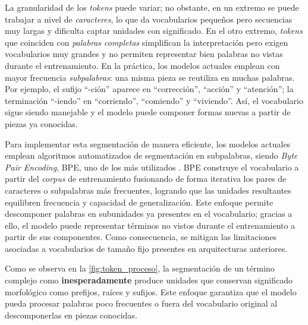 \documentclass[12pt,a4paper]{report}
\begin{document}
La granularidad de los \textit{tokens} puede variar; no obstante, en un extremo se puede trabajar a nivel de \emph{caracteres}, lo que da vocabularios pequeños pero secuencias muy largas y dificulta captar unidades con significado. En el otro extremo, \textit{tokens} que coinciden con \emph{palabras completas} simplifican la interpretación pero exigen vocabularios muy grandes y no permiten representar bien palabras no vistas durante el entrenamiento. En la práctica, los modelos actuales emplean con mayor frecuencia \emph{subpalabras}: una misma pieza se reutiliza en muchas palabras. Por ejemplo, el sufijo ``-ción'' aparece en ``corrección'', ``acción'' y ``atención''; la terminación ``-iendo'' en ``corriendo'', ``comiendo'' y ``viviendo''. Así, el vocabulario sigue siendo manejable y el modelo puede componer formas nuevas a partir de piezas ya conocidas.

Para implementar esta segmentación de manera eficiente, los modelos actuales emplean algoritmos automatizados de segmentación en subpalabras, siendo \textit{Byte Pair Encoding}, BPE, uno de los más utilizados \cite{sennrich-etal-2016-neural}. BPE construye el vocabulario a partir del \textit{corpus} de entrenamiento fusionando de forma iterativa los pares de caracteres o subpalabras más frecuentes, logrando que las unidades resultantes equilibren frecuencia y capacidad de generalización. Este enfoque permite descomponer palabras en subunidades ya presentes en el vocabulario; gracias a ello, el modelo puede representar términos no vistos durante el entrenamiento a partir de sus componentes. Como consecuencia, se mitigan las limitaciones asociadas a vocabularios de tamaño fijo presentes en arquitecturas anteriores.

Como se observa en la \autoref{fig:token_proceso}, la segmentación de un término complejo como \textbf{inesperadamente} produce unidades que conservan significado morfológico como prefijos, raíces y sufijos. Este enfoque garantiza que el modelo pueda procesar palabras poco frecuentes o fuera del vocabulario original al descomponerlas en piezas conocidas.
\end{document}
